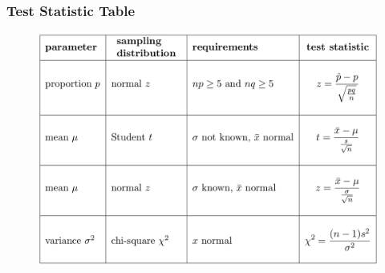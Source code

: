 \documentclass[xcolor=dvipsnames]{beamer}
\begin{document}
\begin{frame}
  \frametitle{Test Statistic Table}
  \begin{figure}[h]
    \includegraphics[scale=0.27]{./diagrams/hyptesttab.png}
  \end{figure}

\end{frame}
\end{document}
